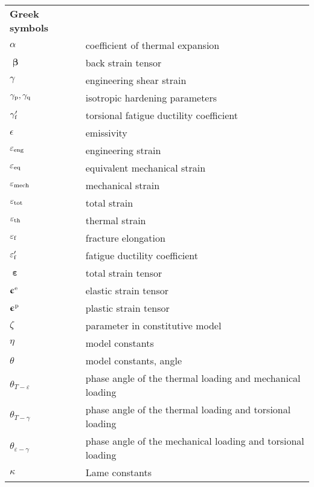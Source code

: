 \renewcommand\arraystretch{1.0}

\begin{table}[htb]
  \centering
    \begin{tabular}{p{3cm}p{10.5cm}}
    \textbf{Greek symbols} & \\
    $\alpha$ & coefficient of thermal expansion \\
    $\bm{\upbeta}$ & back strain tensor \\
    $\gamma$ & engineering shear strain \\
    $\gamma_{\rm{p}}, \gamma_{\rm{q}}$ & isotropic hardening parameters \\
    $\gamma'_{\rm{f}}$ & torsional fatigue ductility coefficient \\
    $\epsilon$ & emissivity \\
    $\varepsilon_{\rm{eng}}$  & engineering strain \\
    $\varepsilon_{\rm{eq}}$  & equivalent mechanical strain \\
    $\varepsilon_{\rm{mech}}$ & mechanical strain \\
    $\varepsilon_{\rm{tot}}$ & total strain \\
    $\varepsilon_{\rm{th}}$ & thermal strain \\
    $\varepsilon_{\rm{f}}$ & fracture elongation \\
    $\varepsilon'_{\rm{f}}$ & fatigue ductility coefficient \\
    $\bm{\upepsilon}$ & total strain tensor \\
    $\bm{\upepsilon}^{\rm{e}}$ & elastic strain tensor \\
    $\bm{\upepsilon}^{\rm{p}}$ & plastic strain tensor \\
    $\zeta$ & parameter in constitutive model \\
    $\eta$ & model constants \\
    $\theta$ & model constants, angle \\
    $\theta_{T-\varepsilon}$ & phase angle of the thermal loading and mechanical loading \\
    $\theta_{T-\gamma}$ & phase angle of the thermal loading and torsional loading \\
    $\theta_{\varepsilon-\gamma}$ & phase angle of the mechanical loading and torsional loading \\
    $\kappa$ & Lame constants \\

\end{tabular}
\end{table}
